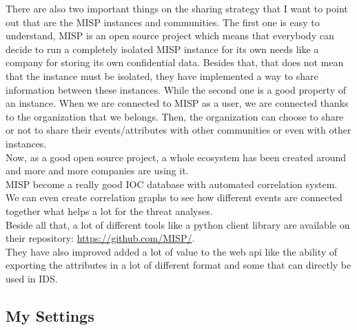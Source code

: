 \documentclass{eplmastersthesis}
\begin{document}
There are also two important things on the sharing strategy that I want to point out that are the MISP instances and communities. The first one is easy to understand, MISP is an open source project which means that everybody can decide to run a completely isolated MISP instance for its own needs like a company for storing its own confidential data. Besides that, that does not mean that the instance must be isolated, they have implemented a way to share information between these instances. While the second one is a good property of an instance. When we are connected to MISP as a user, we are connected thanks to the organization that we belongs. Then, the organization can choose to share or not to share their events/attributes with other communities or even with other instances. \\ 

Now, as a good open source project, a whole ecosystem has been created around and more and more companies are using it.\\
MISP become a really good IOC database with automated correlation system. We can even create correlation graphs to see how different events are connected together what helps a lot for the threat analyses.\\
Beside all that, a lot of different tools like a python client library are available on their repository: \url{https://github.com/MISP/}.\\
They have also improved added a lot of value to the web api like the ability of exporting the attributes in a lot of different format and some that can directly be used in IDS.\\

\subsection{My Settings}
\end{document}
